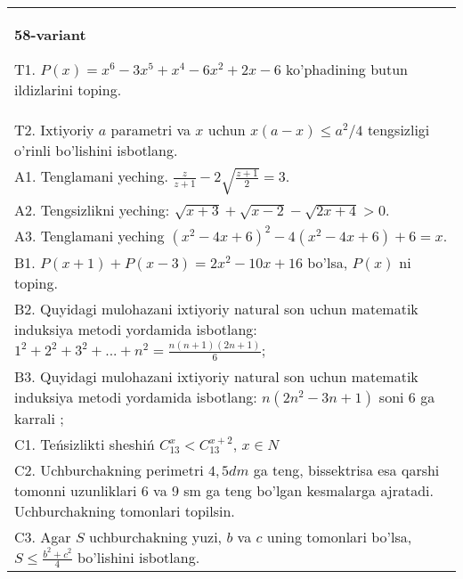 \documentclass{article}
\begin{document}
\begin{tabular}{m{17cm}}
\textbf{58-variant}
\newline

T1. \(P(x) = x^{6} - 3x^{5} + x^{4} - 6x^{2} + 2x - 6\) ko'phadining butun ildizlarini toping. \\
T2. Ixtiyoriy \(a\) parametri va \(x\) uchun \(x(a - x) \leq a^{2}/4\) tengsizligi o'rinli bo'lishini isbotlang. \\
A1. Tenglamani yeching. \(\frac{z}{z + 1} - 2\sqrt{\frac{z + 1}{2}} = 3\). \\
A2. Tengsizlikni yeching: \(\sqrt{x + 3} + \sqrt{x - 2} - \sqrt{2x + 4} > 0\). \\
A3. Tenglamani yeching \(\left( x^{2} - 4x + 6 \right)^{2} - 4\left( x^{2} - 4x + 6 \right) + 6 = x\). \\
B1. \(P(x + 1) + P(x - 3) = 2x^{2} - 10x + 16\) bo'lsa, \(P(x)\) ni toping. \\
B2. Quyidagi mulohazani ixtiyoriy natural son uchun matematik induksiya metodi yordamida isbotlang: \(1^{2} + 2^{2} + 3^{2} + ... + n^{2} = \frac{n(n + 1)(2n + 1)}{6}\); \\
B3. Quyidagi mulohazani ixtiyoriy natural son uchun matematik induksiya metodi yordamida isbotlang: \(n\left( 2n^{2} - 3n + 1 \right)\) soni 6 ga karrali ; \\
C1. Teńsizlikti sheshiń \(C_{13}^{x} < C_{13}^{x + 2}\), \(x \in N\) \\
C2. Uchburchakning perimetri \(4,5dm\) ga teng, bissektrisa esa qarshi tomonni uzunliklari 6 va 9 sm ga teng bo'lgan kesmalarga ajratadi. Uchburchakning tomonlari topilsin. \\
C3. Agar \(S\) uchburchakning yuzi, \(b\) va \(c\) uning tomonlari bo'lsa, \(S \leq \frac{b^{2} + c^{2}}{4}\) bo'lishini isbotlang. \\

\end{tabular}
\vspace{1cm}
\end{document}
